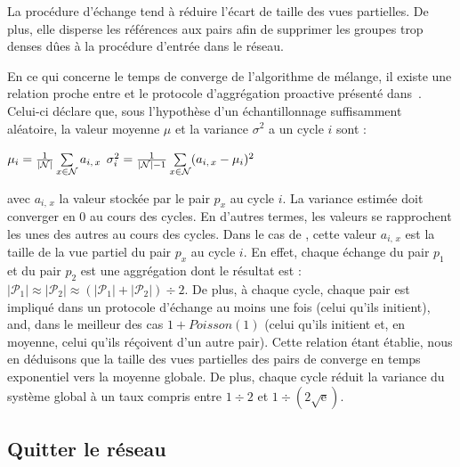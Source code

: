 La procédure d'échange tend à réduire l'écart de taille des vues partielles. De
plus, elle disperse les références aux pairs afin de supprimer les groupes trop
denses dûes à la procédure d'entrée dans le réseau.

En ce qui concerne le temps de converge de l'algorithme de mélange, il existe
une relation proche entre \SPRAY et le protocole d'aggrégation proactive
présenté dans~\cite{jelasity2004epidemic, montresor2004robust}. Celui-ci déclare
que, sous l'hypothèse d'un échantillonnage suffisamment aléatoire, la valeur
moyenne $\mu$ et la variance $\sigma^2$ a un cycle $i$ sont :
\begin{center}
  $\mu_i = {1\over{|\mathcal{N}|}} \sum\limits_{x \in \mathcal{N}} a_{i,\,x}$
  \hfill
  $\sigma^2_i = {1\over{|\mathcal{N}|-1}}\sum\limits_{x \in \mathcal{N}}
  (a_{i,\,x} - \mu_i)^2$
\end{center}
avec $a_{i,\,x}$ la valeur stockée par le pair $p_x$ au cycle $i$. La variance
estimée doit converger en 0 au cours des cycles. En d'autres termes, les valeurs
se rapprochent les unes des autres au cours des cycles. Dans le cas de \SPRAY,
cette valeur $a_{i,\,x}$ est la taille de la vue partiel du pair $p_x$ au cycle
$i$. En effet, chaque échange du pair $p_1$ et du pair $p_2$ est une aggrégation
dont le résultat est :
$|\mathcal{P}_1|\approx|\mathcal{P}_2|\approx{(|\mathcal{P}_1| +
  |\mathcal{P}_2|) \div 2}$.
De plus, à chaque cycle, chaque pair est impliqué dans un protocole d'échange au
moins une fois (celui qu'ils initient), and, dans le meilleur des cas
$1+Poisson(1)$ (celui qu'ils initient et, en moyenne, celui qu'ils réçoivent
d'un autre pair). Cette relation étant établie, nous en déduisons que la taille
des vues partielles des pairs de \SPRAY converge en temps exponentiel vers la
moyenne globale. De plus, chaque cycle réduit la variance du système global à un
taux compris entre ${1\div 2}$ et $1\div ({2\sqrt{\text{e}}})$.

\subsection{Quitter le réseau}

